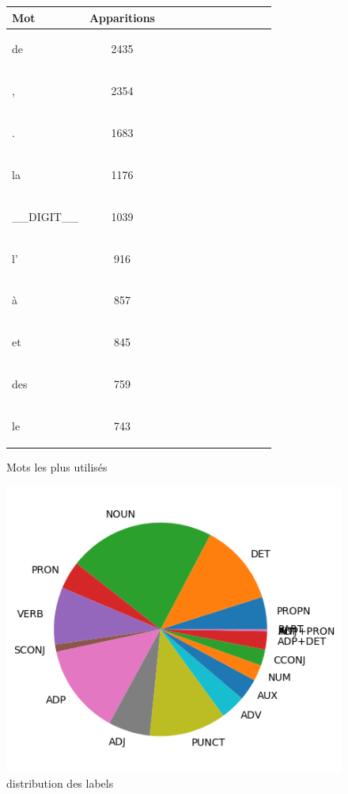 \begin{figure}[H] \begin{minipage}{0.48\textwidth} \centering \begin{tabular}{|l || *{11 }{|c} |} \hline
Mot & Apparitions  \\ \hline
\begin{verb} de \end{verb} &2435\\ \hline
\begin{verb} , \end{verb} &2354\\ \hline
\begin{verb} . \end{verb} &1683\\ \hline
\begin{verb} la \end{verb} &1176\\ \hline
\begin{verb} __DIGIT__ \end{verb} &1039\\ \hline
\begin{verb} l' \end{verb} &916\\ \hline
\begin{verb} à \end{verb} &857\\ \hline
\begin{verb} et \end{verb} &845\\ \hline
\begin{verb} des \end{verb} &759\\ \hline
\begin{verb} le \end{verb} &743\\ \hline

\end{tabular}
\caption{ Mots les plus utilisés } \label{Fig:muw}\end{minipage} 
\begin{minipage}{0.48\textwidth} \centering
\includegraphics[width=.7\linewidth]{sequoiatrain_img.png}
\caption{distribution des labels}
\end{minipage}
\end{figure}


